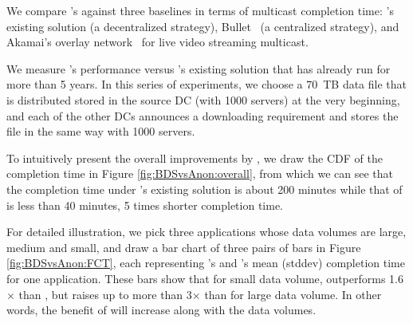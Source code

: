 We compare \name's against three baselines in terms of
multicast completion time:
\company's existing solution (a decentralized strategy),
Bullet~\cite{??} (a centralized strategy), and
Akamai's overlay network~\cite{??} for live video streaming
multicast.






We measure \name's performance versus \company's existing solution that has already run for more than 5 years. In this series of experiments, we choose a 70~TB data file that is distributed stored in the source DC (with 1000 servers) at the very beginning, and each of the other DCs announces a downloading requirement and stores the file in the same way with 1000 servers.


To intuitively present the overall improvements by \name, we draw the CDF of the completion time in Figure \ref{fig:BDSvsAnon:overall}, from which we can see that the completion time under \company's existing solution is about 200 minutes while that of \name is less than 40 minutes, 5 times shorter completion time.

For detailed illustration, we pick three applications whose data volumes are large, medium and small, and draw a bar chart of three pairs of bars in Figure \ref{fig:BDSvsAnon:FCT}, each representing \name's and \company's mean (stddev) completion time for one application. These bars show that for small data volume, \name outperforms 1.6$\times$ than \company, but raises up to more than 3$\times$ than \company for large data volume. In other words, the benefit of \name will increase along with the data volumes.

